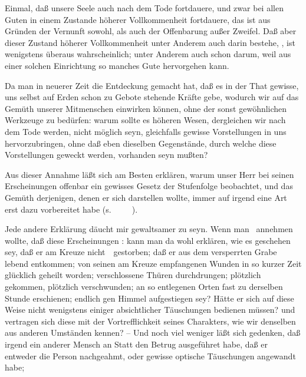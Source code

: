 \begin{aufza}
\begin{aufzb}
\item Einmal, daß unsere Seele auch nach dem Tode fortdauere, und zwar bei allen Guten in einem Zustande höherer Vollkommenheit fortdauere, das ist aus Gründen der Vernunft sowohl, als auch der Offenbarung außer Zweifel. Daß aber dieser Zustand höherer Vollkommenheit unter Anderem auch darin bestehe, , ist wenigstens überaus wahrscheinlich; unter Anderem auch schon darum, weil aus einer solchen Einrichtung so manches Gute hervorgehen kann.
\item Da man in neuerer Zeit die Entdeckung gemacht hat, daß es in der That gewisse, uns selbst auf Erden schon zu Gebote stehende Kräfte gebe, wodurch wir auf das Gemüth unserer Mitmenschen einwirken können, ohne der sonst gewöhnlichen Werkzeuge zu bedürfen: warum sollte es höheren Wesen, dergleichen wir nach dem Tode werden, nicht möglich seyn, gleichfalls gewisse Vorstellungen in uns hervorzubringen, ohne daß eben dieselben Gegenstände, durch welche diese Vorstellungen geweckt werden, vorhanden seyn mußten?
\item Aus dieser Annahme läßt sich am Besten erklären, warum unser Herr bei seinen Erscheinungen offenbar ein gewisses Gesetz der Stufenfolge beobachtet, und das Gemüth derjenigen, denen er sich darstellen wollte, immer auf irgend eine Art erst dazu vorbereitet habe (s.\ \ \ \ \ \udgl ).
\item Jede andere Erklärung däucht mir gewaltsamer zu seyn. Wenn man \zB\ annehmen wollte, daß  diese Erscheinungen : kann man da wohl erklären, wie es geschehen sey, daß er am Kreuze nicht~\ gestorben; daß er aus dem versperrten Grabe lebend entkommen; von seinen am Kreuze empfangenen Wunden in so kurzer Zeit glücklich geheilt worden; verschlossene Thüren durchdrungen; plötzlich gekommen, plötzlich verschwunden; an so entlegenen Orten fast zu derselben Stunde erschienen; endlich gen Himmel aufgestiegen sey? Hätte er sich auf diese Weise nicht wenigstens einiger absichtlicher Täuschungen bedienen müssen? und vertragen sich diese mit der Vortrefflichkeit seines Charakters, wie wir denselben aus anderen Umständen kennen? -- Und noch viel weniger läßt sich gedenken, daß irgend ein anderer Mensch an  Statt den Betrug ausgeführet habe, daß er entweder die Person  nachgeahmt, oder gewisse optische Täuschungen angewandt habe; \udgl\ 

\end{aufzb}
\end{aufza}
